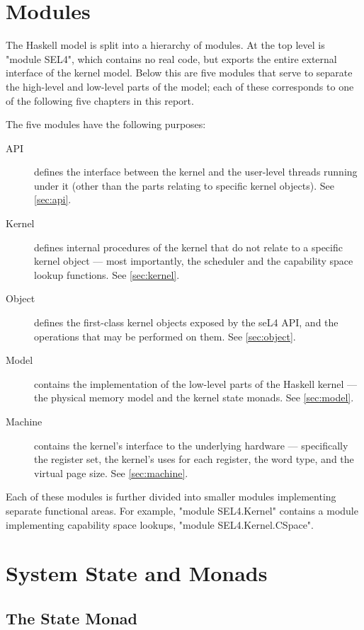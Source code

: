 \section[modules]{Modules}

The Haskell model is split into a hierarchy of modules. At the top level is "module SEL4", which contains no real code, but exports the entire external interface of the kernel model. Below this are five modules that serve to separate the high-level and low-level parts of the model; each of these corresponds to one of the following five chapters in this report.

The five modules have the following purposes:
\begin{description}
\item[API] defines the interface between the kernel and the user-level threads running under it (other than the parts relating to specific kernel objects). See \autoref{sec:api}.
\item[Kernel] defines internal procedures of the kernel that do not relate to a specific kernel object --- most importantly, the scheduler and the capability space lookup functions. See \autoref{sec:kernel}.
\item[Object] defines the first-class kernel objects exposed by the seL4 API, and the operations that may be performed on them. See \autoref{sec:object}.
\item[Model] contains the implementation of the low-level parts of the Haskell kernel --- the physical memory model and the kernel state monads. See \autoref{sec:model}.
\item[Machine] contains the kernel's interface to the underlying hardware --- specifically the register set, the kernel's uses for each register, the word type, and the virtual page size. See \autoref{sec:machine}.
\end{description}

Each of these modules is further divided into smaller modules implementing separate functional areas. For example, "module SEL4.Kernel" contains a module implementing capability space lookups, "module SEL4.Kernel.CSpace".

\section[state-monads]{System State and Monads}

\subsection{The State Monad}


